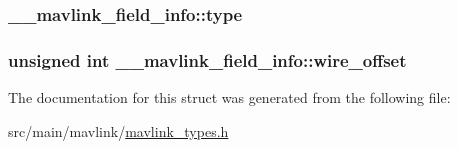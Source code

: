 \hypertarget{struct____mavlink__field__info_a32f98e7c869ae1567c4ad366c74b6552}{
\subsubsection[{type}]{ \+\_\+\+\_\+mavlink\+\_\+field\+\_\+info\+::type}}\label{struct____mavlink__field__info_a32f98e7c869ae1567c4ad366c74b6552}
\hypertarget{struct____mavlink__field__info_a7156648575e497f112fde78e851dd4d9}{
\subsubsection[{wire\+\_\+offset}]{\setlength{\rightskip}{0pt plus 5cm}unsigned int \+\_\+\+\_\+mavlink\+\_\+field\+\_\+info\+::wire\+\_\+offset}}\label{struct____mavlink__field__info_a7156648575e497f112fde78e851dd4d9}


The documentation for this struct was generated from the following file\+:\begin{DoxyCompactItemize}
\item 
src/main/mavlink/\hyperlink{mavlink__types_8h}{mavlink\+\_\+types.\+h}\end{DoxyCompactItemize}

